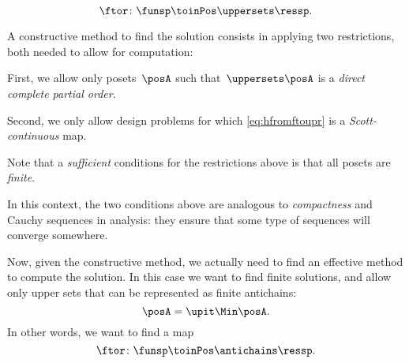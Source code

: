 \begin{equation}
    \label{eq:hfromftoupr}
    \ftor\colon \funsp \toinPos \uppersets \ressp.
\end{equation}


A constructive method to find the solution consists in applying two restrictions, both needed to allow for computation:
\begin{compactenum}
    \item First, we allow only posets~$\posA$ such that~$\uppersets \posA$ is a \emph{direct complete partial order}.
    \item Second, we only allow design problems for which \cref{eq:hfromftoupr} is a \emph{Scott-continuous} map.
\end{compactenum}
Note that a \emph{sufficient} conditions for the restrictions above is that all posets are \emph{finite}.
\begin{remark}
    In this context, the two conditions above are analogous to \emph{compactness} and Cauchy sequences in analysis: they ensure that some type of sequences will converge somewhere.
\end{remark}


Now, given the constructive method, we actually need to find an effective method to compute the solution.
In this case we want to find finite solutions, and allow only upper sets that can be represented as finite antichains:
\begin{equation*}
    \posA=\upit \Min \posA.
\end{equation*}
In other words, we want to find a map
\begin{equation}
    \label{eq:hfromftoantir}
    \ftor\colon \funsp \toinPos \antichains \ressp.
\end{equation}

